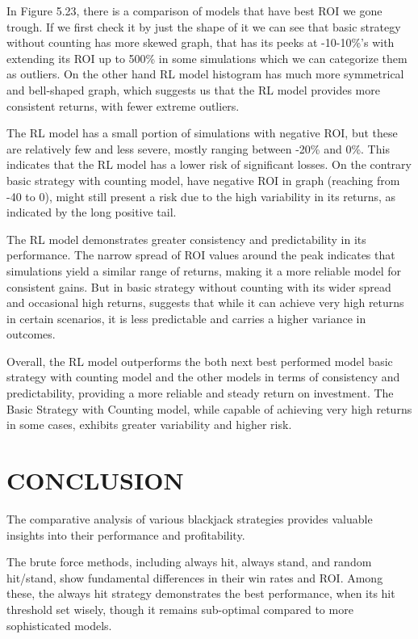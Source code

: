 \documentclass[a4paper,12pt]{report}
\begin{document}
In Figure 5.23, there is a comparison of models that have best ROI we gone trough. If we first check it by just the shape of it we can see that basic strategy without counting has more skewed graph, that has its peeks at -10-10\%'s with extending its ROI up to 500\% in some simulations which we can categorize them as outliers. On the other hand RL model histogram has much more symmetrical and bell-shaped graph, which suggests us that the RL model provides more consistent returns, with fewer extreme outliers.

The RL model has a small portion of simulations with negative ROI, but these are relatively few and less severe, mostly ranging between -20\% and 0\%. This indicates that the RL model has a lower risk of significant losses. On the contrary basic strategy with counting model, have negative ROI in graph (reaching from -40 to 0), might still present a risk due to the high variability in its returns, as indicated by the long positive tail.

The RL model demonstrates greater consistency and predictability in its performance. The narrow spread of ROI values around the peak indicates that simulations yield a similar range of returns, making it a more reliable model for consistent gains. But in basic strategy without counting with its wider spread and occasional high returns, suggests that while it can achieve very high returns in certain scenarios, it is less predictable and carries a higher variance in outcomes.

Overall, the RL model outperforms the both next best performed model basic strategy with counting model and the other models in terms of consistency and predictability, providing a more reliable and steady return on investment. The Basic Strategy with Counting model, while capable of achieving very high returns in some cases, exhibits greater variability and higher risk. 

\chapter{CONCLUSION}
\label{chapter:conclusion}

The comparative analysis of various blackjack strategies provides valuable insights into their performance and profitability. 

The brute force methods, including always hit, always stand, and random hit/stand, show fundamental differences in their win rates and ROI. Among these, the always hit strategy demonstrates the best performance, when its hit threshold set wisely, though it remains sub-optimal compared to more sophisticated models.
\end{document}
